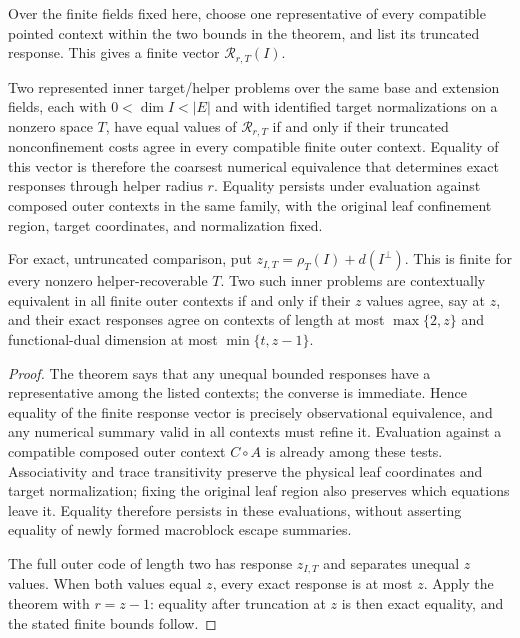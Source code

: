 Over the finite fields fixed here, choose one representative of every
compatible pointed context within the two bounds in the theorem, and list its
truncated response.  This gives a finite vector
$\mathcal R_{r,T}(I)$.

\begin{corollary}
\label{cor:bounded-contextual-state}
%
Two represented inner target/helper problems over the same base and extension
fields, each with $0<\dim I<|E|$ and with identified target normalizations on
a nonzero space $T$, have equal values of $\mathcal R_{r,T}$ if and only if
their truncated nonconfinement costs agree in every compatible finite outer
context.
Equality of this vector is therefore the coarsest numerical equivalence that
determines exact responses through helper radius $r$.  Equality persists under
evaluation against composed outer contexts in the same family, with the
original leaf confinement region, target coordinates, and normalization fixed.

For exact, untruncated comparison, put
$z_{I,T}=\rho_T(I)+d(I^\perp)$.  This is finite for every nonzero
helper-recoverable $T$.  Two such inner problems are contextually equivalent
in all finite outer contexts if and only if their $z$ values agree, say at
$z$, and their exact responses agree on contexts of length at most
$\max\{2,z\}$ and functional-dual dimension at most
$\min\{t,z-1\}$.
\end{corollary}

\begin{proof}
The theorem says that any unequal bounded responses have a representative
among the listed contexts; the converse is immediate.  Hence equality of the
finite response vector is precisely observational equivalence, and any
numerical summary valid in all contexts must refine it.  Evaluation against a
compatible composed outer context $C\circ A$ is already among these tests.
Associativity and trace transitivity preserve the physical leaf coordinates
and target normalization; fixing the original leaf region also preserves
which equations leave it.  Equality therefore persists in these evaluations,
without asserting equality of newly formed macroblock escape summaries.

The full outer code of length two has response $z_{I,T}$ and separates unequal
$z$ values.  When both values equal $z$, every exact response is at most $z$.
Apply the theorem with $r=z-1$: equality after truncation at $z$ is then exact
equality, and the stated finite bounds follow.
%
%
\end{proof}
